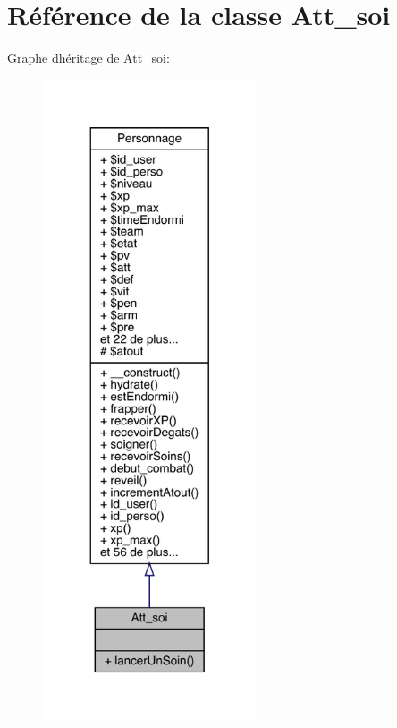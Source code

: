 \hypertarget{class_att__soi}{}\section{Référence de la classe Att\+\_\+soi}
\label{class_att__soi}


Graphe d\textquotesingle{}héritage de Att\+\_\+soi\+:\nopagebreak
\begin{figure}[H]
\begin{center}
\leavevmode
\includegraphics[width=179pt]{class_att__soi__inherit__graph}
\end{center}
\end{figure}


